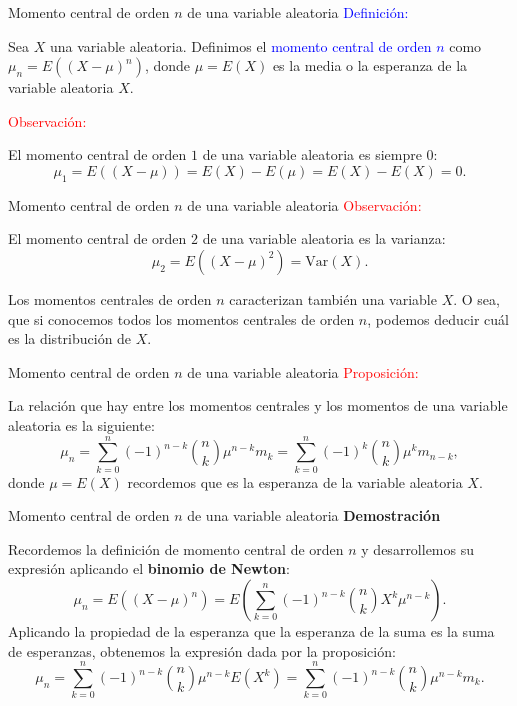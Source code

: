 \documentclass[
  ignorenonframetext,
  aspectratio=169]{beamer}
\newcommand\blue[1]{\textcolor{blue}{#1}}
\newcommand\red[1]{\textcolor{red}{#1}}
\begin{document}
\begin{frame}{Momento central de orden \(n\) de una variable aleatoria}
\protect\hypertarget{momento-central-de-orden-n-de-una-variable-aleatoria}{}
\blue{Definición:}

Sea \(X\) una variable aleatoria. Definimos el
\blue{momento central de orden $n$} como
\(\mu_n = E\left((X-\mu)^n\right)\), donde \(\mu =E(X)\) es la media o
la esperanza de la variable aleatoria \(X\).

\red{Observación:}

El momento central de orden \(1\) de una variable aleatoria es siempre
0: \[
\mu_1 = E\left((X-\mu)\right)=E(X)-E(\mu)=E(X)-E(X)=0.
\]
\end{frame}

\begin{frame}{Momento central de orden \(n\) de una variable aleatoria}
\protect\hypertarget{momento-central-de-orden-n-de-una-variable-aleatoria-1}{}
\red{Observación:}

El momento central de orden \(2\) de una variable aleatoria es la
varianza: \[
\mu_2 = E\left((X-\mu)^2\right)= \mathrm{Var}(X).
\]

Los momentos centrales de orden \(n\) caracterizan también una variable
\(X\). O sea, que si conocemos todos los momentos centrales de orden
\(n\), podemos deducir cuál es la distribución de \(X\).
\end{frame}

\begin{frame}{Momento central de orden \(n\) de una variable aleatoria}
\protect\hypertarget{momento-central-de-orden-n-de-una-variable-aleatoria-2}{}
\red{Proposición:}

La relación que hay entre los momentos centrales y los momentos de una
variable aleatoria es la siguiente: \[
\mu_n = \sum_{k=0}^n (-1)^{n-k} \binom{n}{k} \mu^{n-k} m_k = \sum_{k=0}^n (-1)^{k} \binom{n}{k} \mu^{k} m_{n-k},
\] donde \(\mu =E(X)\) recordemos que es la esperanza de la variable
aleatoria \(X\).
\end{frame}

\begin{frame}{Momento central de orden \(n\) de una variable aleatoria}
\protect\hypertarget{momento-central-de-orden-n-de-una-variable-aleatoria-3}{}
\textbf{Demostración}

Recordemos la definición de momento central de orden \(n\) y
desarrollemos su expresión aplicando el \textbf{binomio de Newton}: \[
\mu_n = E\left((X-\mu)^n\right) =E\left(\sum_{k=0}^n (-1)^{n-k} \binom{n}{k} X^k\mu^{n-k}\right).
\] Aplicando la propiedad de la esperanza que la esperanza de la suma es
la suma de esperanzas, obtenemos la expresión dada por la proposición:
\[
\mu_n =\sum_{k=0}^n (-1)^{n-k} \binom{n}{k} \mu^{n-k} E\left(X^k\right) = \sum_{k=0}^n (-1)^{n-k} \binom{n}{k} \mu^{n-k} m_k.
\]
\end{frame}
\end{document}
